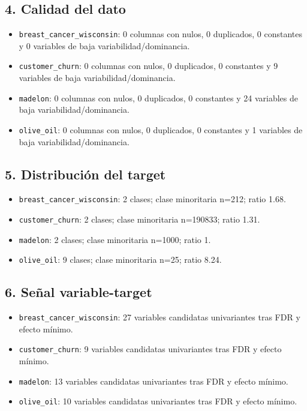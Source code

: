\subsection{4. Calidad del dato}
\begin{itemize}
\item \texttt{breast\_cancer\_wisconsin}: 0 columnas con nulos, 0 duplicados, 0 constantes y 0 variables de baja variabilidad/dominancia.
\item \texttt{customer\_churn}: 0 columnas con nulos, 0 duplicados, 0 constantes y 9 variables de baja variabilidad/dominancia.
\item \texttt{madelon}: 0 columnas con nulos, 0 duplicados, 0 constantes y 24 variables de baja variabilidad/dominancia.
\item \texttt{olive\_oil}: 0 columnas con nulos, 0 duplicados, 0 constantes y 1 variables de baja variabilidad/dominancia.
\end{itemize}

\subsection{5. Distribución del target}
\begin{itemize}
\item \texttt{breast\_cancer\_wisconsin}: 2 clases; clase minoritaria n=212; ratio 1.68.
\item \texttt{customer\_churn}: 2 clases; clase minoritaria n=190833; ratio 1.31.
\item \texttt{madelon}: 2 clases; clase minoritaria n=1000; ratio 1.
\item \texttt{olive\_oil}: 9 clases; clase minoritaria n=25; ratio 8.24.
\end{itemize}

\subsection{6. Señal variable-target}
\begin{itemize}
\item \texttt{breast\_cancer\_wisconsin}: 27 variables candidatas univariantes tras FDR y efecto mínimo.
\item \texttt{customer\_churn}: 9 variables candidatas univariantes tras FDR y efecto mínimo.
\item \texttt{madelon}: 13 variables candidatas univariantes tras FDR y efecto mínimo.
\item \texttt{olive\_oil}: 10 variables candidatas univariantes tras FDR y efecto mínimo.
\end{itemize}

